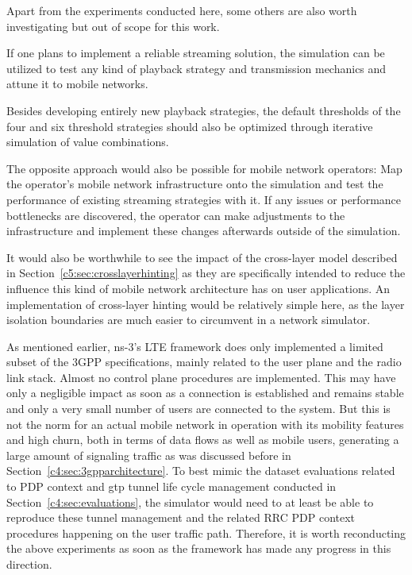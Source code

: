 Apart from the experiments conducted here, some others are also worth investigating but out of scope for this work.

If one plans to implement a reliable streaming solution, the simulation can be utilized to test any kind of playback strategy and transmission mechanics and attune it to mobile networks. 

Besides developing entirely new playback strategies, the default thresholds of the four and six threshold strategies should also be optimized through iterative simulation of value combinations.

The opposite approach would also be possible for mobile network operators: Map the operator's mobile network infrastructure onto the simulation and test the performance of existing streaming strategies with it. If any issues or performance bottlenecks are discovered, the operator can make adjustments to the infrastructure and implement these changes afterwards outside of the simulation.

It would also be worthwhile to see the impact of the cross-layer model described in Section~\ref{c5:sec:crosslayerhinting} as they are specifically intended to reduce the influence this kind of mobile network architecture has on user applications. An implementation of cross-layer hinting would be relatively simple here, as the layer isolation boundaries are much easier to circumvent in a network simulator.

As mentioned earlier, ns-3's \gls{LTE} framework does only implemented a limited subset of the \gls{3GPP} specifications, mainly related to the user plane and the radio link stack. Almost no control plane procedures are implemented. This may have only a negligible impact as soon as a connection is established and remains stable and only a very small number of users are connected to the system. But this is not the norm for an actual mobile network in operation with its mobility features and high churn, both in terms of data flows as well as mobile users, generating a large amount of signaling traffic as was discussed before in Section~\ref{c4:sec:3gpparchitecture}. To best mimic the dataset evaluations related to \gls{PDP} context and \gls{gtp} tunnel life cycle management conducted in Section~\ref{c4:sec:evaluations}, the simulator would need to at least be able to reproduce these tunnel management and the related \gls{RRC} \gls{PDP} context procedures happening on the user traffic path. Therefore, it is worth reconducting the above experiments as soon as the framework has made any progress in this direction.

